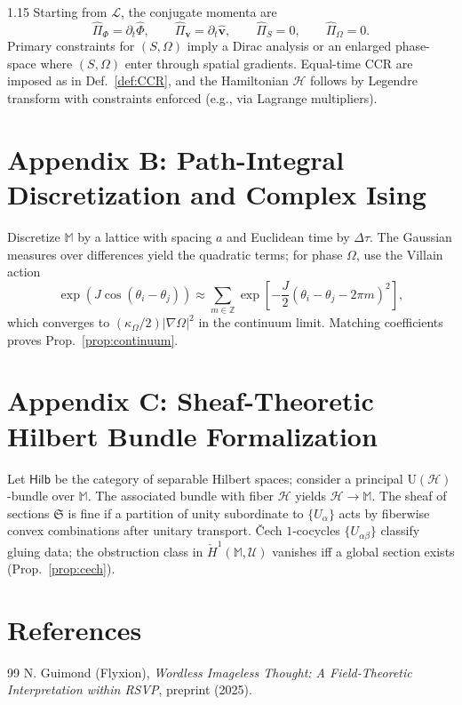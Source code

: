 \documentclass[12pt,a4paper]{article}
\numberwithin{equation}{section}
\theoremstyle{definition}
\theoremstyle{plain}
\theoremstyle{remark}
\newcommand{\M}{\mathbb{M}}
\newcommand{\hPhi}{\hat{\Phi}}
\newcommand{\hv}{\hat{\mathbf{v}}}
\newcommand{\hPi}{\hat{\Pi}}
\newcommand{\Lcal}{\mathcal{L}}
\newcommand{\Hcal}{\mathcal{H}}
\begin{document}
\begin{spacing}{1.15}
Starting from $\Lcal$, the conjugate momenta are
\[
\hPi_\Phi = \partial_t \hPhi,\qquad
\hPi_{\mathbf{v}} = \partial_t \hv,\qquad
\hPi_S = 0,\qquad
\hPi_\Omega = 0.
\]
Primary constraints for $(S,\Omega)$ imply a Dirac analysis or an enlarged phase-space where $(S,\Omega)$ enter through spatial gradients. Equal-time CCR are imposed as in Def.~\ref{def:CCR}, and the Hamiltonian $\Hcal$ follows by Legendre transform with constraints enforced (e.g., via Lagrange multipliers).

\section*{Appendix B: Path-Integral Discretization and Complex Ising}
\renewcommand\theequation{B.\arabic{equation}}
\setcounter{equation}{0}

Discretize $\M$ by a lattice with spacing $a$ and Euclidean time by $\Delta\tau$. The Gaussian measures over differences yield the quadratic terms; for phase $\Omega$, use the Villain action
\[
\exp\!\left(J\cos(\theta_i-\theta_j)\right)\approx 
\sum_{m\in\mathbb{Z}}\exp\!\left[-\frac{J}{2}(\theta_i-\theta_j-2\pi m)^2\right],
\]
which converges to $(\kappa_\Omega/2)|\nabla \Omega|^2$ in the continuum limit. Matching coefficients proves Prop.~\ref{prop:continuum}.

\section*{Appendix C: Sheaf-Theoretic Hilbert Bundle Formalization}
\renewcommand\theequation{C.\arabic{equation}}
\setcounter{equation}{0}

Let $\mathsf{Hilb}$ be the category of separable Hilbert spaces; consider a principal $\mathrm{U}(\mathcal{H})$-bundle over $\M$. The associated bundle with fiber $\mathcal{H}$ yields $\mathscr{H}\to \M$. The sheaf of sections $\mathfrak{S}$ is fine if a partition of unity subordinate to $\{U_\alpha\}$ acts by fiberwise convex combinations after unitary transport. Čech $1$-cocycles $\{U_{\alpha\beta}\}$ classify gluing data; the obstruction class in $\check{H}^1(\M,\mathcal{U})$ vanishes iff a global section exists (Prop.~\ref{prop:cech}).



\section*{References}
\begin{thebibliography}{99}
N. Guimond (Flyxion), \emph{Wordless Imageless Thought: A Field-Theoretic Interpretation within RSVP}, preprint (2025).


\end{thebibliography}
\end{spacing}
\end{document}
